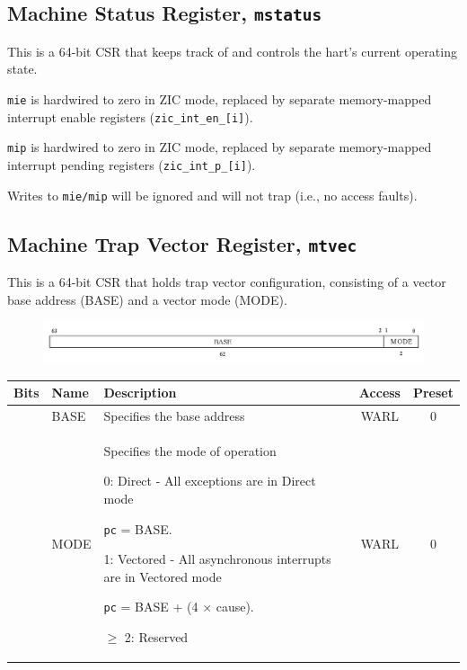 \subsection{Machine Status Register, \texttt{mstatus}}
\label{subsec:mstatus}

This is a 64-bit CSR that keeps track of and controls the hart's current operating state.

\texttt{mie} is hardwired to zero in ZIC mode, replaced by separate memory-mapped interrupt enable registers (\texttt{zic\_int\_en\_[i]}).

\texttt{mip} is hardwired to zero in ZIC mode, replaced by separate memory-mapped interrupt pending registers (\texttt{zic\_int\_p\_[i]}).

Writes to \texttt{mie/mip} will be ignored and will not trap (i.e., no access faults). 

\subsection{Machine Trap Vector Register, \texttt{mtvec}}
\label{subsec:mtvec}

This is a 64-bit CSR that holds trap vector configuration, consisting of a vector base address (BASE) and a vector mode (MODE).

\vspace{0.5cm}
\begin{figure}[H]
    \centering
    \includegraphics[width = 15.25cm]{images/csr_mtvec.png}
    \label{fig:csr_mtvec}
\end{figure}
\vspace{0.25cm}

\vspace{0.5cm}
\begin{table}[H]
    \label{tab:csr_mtvec}
        \centering
        \begin{tabular}{l l p{8cm} c c}
         \hline 
         \textbf{Bits} & \textbf{Name} & \textbf{Description} & \textbf{Access} & \textbf{Preset}\\ \hline \hline
         [63:2] & BASE & Specifies the base address & WARL & 0 \\ \hline
         [1:0] & MODE & Specifies the mode of operation
         
         0: Direct - All exceptions are in Direct mode 
         
         \hspace{1cm} \texttt{pc} = BASE.
         
         1: Vectored - All asynchronous interrupts are in Vectored mode
         
         \hspace{1cm} \texttt{pc} = BASE + (4 $\times$ cause).
         
         $\geq$ 2: Reserved & WARL & 0\\ \hline
        \end{tabular}
\end{table}
\vspace{0.5cm}

